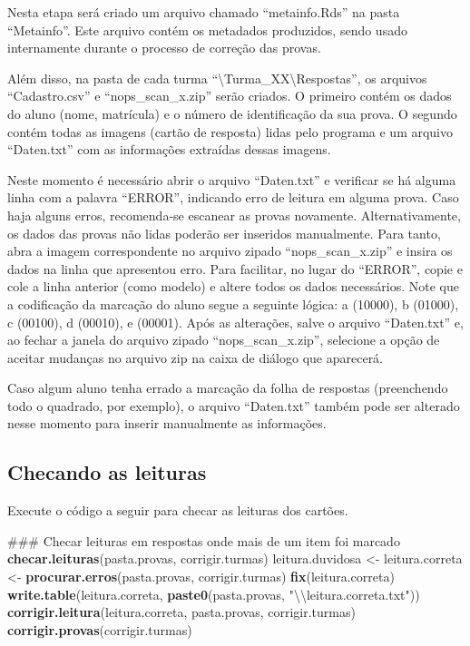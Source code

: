 \documentclass[a4paper]{report}
\newenvironment{Shaded}{\begin{snugshade}}{\end{snugshade}}
\newcommand{\KeywordTok}[1]{\textcolor[rgb]{0.13,0.29,0.53}{\textbf{#1}}}
\newcommand{\CharTok}[1]{\textcolor[rgb]{0.31,0.60,0.02}{#1}}
\newcommand{\StringTok}[1]{\textcolor[rgb]{0.31,0.60,0.02}{#1}}
\newcommand{\NormalTok}[1]{#1}
\begin{document}
Nesta etapa será criado um arquivo chamado ``metainfo.Rds'' na pasta
``Metainfo''. Este arquivo contém os metadados produzidos, sendo usado
internamente durante o processo de correção das provas.

Além disso, na pasta de cada turma
``\textbackslash{}Turma\_XX\textbackslash{}Respostas'', os arquivos
``Cadastro.csv'' e ``nops\_scan\_x.zip'' serão criados. O primeiro
contém os dados do aluno (nome, matrícula) e o número de identificação
da sua prova. O segundo contém todas as imagens (cartão de resposta)
lidas pelo programa e um arquivo ``Daten.txt'' com as informações
extraídas dessas imagens.

Neste momento é necessário abrir o arquivo ``Daten.txt'' e verificar se
há alguma linha com a palavra ``ERROR'', indicando erro de leitura em
alguma prova. Caso haja alguns erros, recomenda-se escanear as provas
novamente. Alternativamente, os dados das provas não lidas poderão ser
inseridos manualmente. Para tanto, abra a imagem correspondente no
arquivo zipado ``nops\_scan\_x.zip'' e insira os dados na linha que
apresentou erro. Para facilitar, no lugar do ``ERROR'', copie e cole a
linha anterior (como modelo) e altere todos os dados necessários. Note
que a codificação da marcação do aluno segue a seguinte lógica: a
(10000), b (01000), c (00100), d (00010), e (00001). Após as alterações,
salve o arquivo ``Daten.txt'' e, ao fechar a janela do arquivo zipado
``nops\_scan\_x.zip'', selecione a opção de aceitar mudanças no arquivo
zip na caixa de diálogo que aparecerá.

Caso algum aluno tenha errado a marcação da folha de respostas
(preenchendo todo o quadrado, por exemplo), o arquivo ``Daten.txt''
também pode ser alterado nesse momento para inserir manualmente as
informações.

\subsection{Checando as leituras}

Execute o código a seguir para checar as leituras dos cartões.

\begin{Shaded}
\begin{Highlighting}[]
\NormalTok{### Checar leituras em respostas onde mais de um item foi marcado}
\KeywordTok{checar.leituras}\NormalTok{(pasta.provas, corrigir.turmas)}
\NormalTok{leitura.duvidosa <-}\StringTok{ }\NormalTok{leitura.correta <-}\StringTok{ }\KeywordTok{procurar.erros}\NormalTok{(pasta.provas, corrigir.turmas)}
\KeywordTok{fix}\NormalTok{(leitura.correta)}
\KeywordTok{write.table}\NormalTok{(leitura.correta, }\KeywordTok{paste0}\NormalTok{(pasta.provas, }\StringTok{"}\CharTok{\textbackslash{}\textbackslash{}}\StringTok{leitura.correta.txt"}\NormalTok{))}
\KeywordTok{corrigir.leitura}\NormalTok{(leitura.correta, pasta.provas, corrigir.turmas)}
\KeywordTok{corrigir.provas}\NormalTok{(corrigir.turmas)}
\end{Highlighting}
\end{Shaded}
\end{document}
